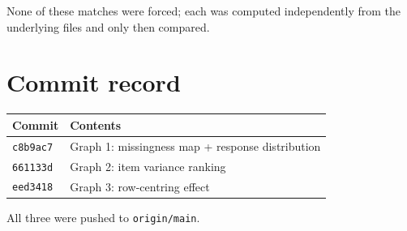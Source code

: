 \documentclass[11pt]{article}
\begin{document}
None of these matches were forced; each was computed independently from the
underlying files and only then compared.

\section{Commit record}

\begin{center}
\begin{tabular}{ll}
\toprule
Commit & Contents \\
\midrule
\texttt{c8b9ac7} & Graph 1: missingness map + response distribution \\
\texttt{661133d} & Graph 2: item variance ranking \\
\texttt{eed3418} & Graph 3: row-centring effect \\
\bottomrule
\end{tabular}
\end{center}

All three were pushed to \texttt{origin/main}.
\end{document}
